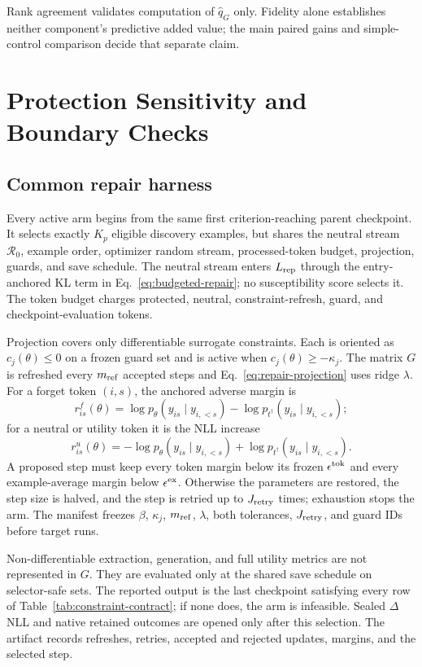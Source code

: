 Rank agreement validates computation of $\widehat q_G$ only. Fidelity alone
establishes neither component's predictive added value; the main paired gains
and simple-control comparison decide that separate claim.

\FloatBarrier

\section{Protection Sensitivity and Boundary Checks}
\label{app:protection-supp}
\label{app:protection-details}

\subsection{Common repair harness}
\label{app:guard-proof}
\label{app:repair-protocol}

Every active arm begins from the same first criterion-reaching parent
checkpoint. It selects exactly $K_p$ eligible discovery examples, but shares
the neutral stream $\mathcal R_0$, example order, optimizer random stream,
processed-token budget, projection, guards, and save schedule. The neutral
stream enters $L_{\rm rep}$ through the entry-anchored KL term in
Eq.~\eqref{eq:budgeted-repair}; no susceptibility score selects it. The token
budget charges protected, neutral, constraint-refresh, guard, and
checkpoint-evaluation tokens.

Projection covers only differentiable surrogate constraints. Each is oriented
as $c_j(\theta)\leq0$ on a frozen guard set and is active when
$c_j(\theta)\geq-\kappa_j$. The matrix $G$ is refreshed every $m_{\rm ref}$
accepted steps and Eq.~\eqref{eq:repair-projection} uses ridge $\lambda$.
For a forget token $(i,s)$, the anchored adverse margin is
\[
 r^{f}_{is}(\theta)=\log p_\theta(y_{is}\mid y_{i,<s})-
 \log p_{t^\dagger}(y_{is}\mid y_{i,<s});
\]
for a neutral or utility token it is the NLL increase
\[
 r^{u}_{is}(\theta)=-\log p_\theta(y_{is}\mid y_{i,<s})+
 \log p_{t^\dagger}(y_{is}\mid y_{i,<s}).
\]
A proposed step must keep every token margin below its frozen
$\epsilon^{\rm tok}$ and every example-average margin below
$\epsilon^{\rm ex}$. Otherwise the parameters are restored, the step size is
halved, and the step is retried up to $J_{\rm retry}$ times; exhaustion stops
the arm. The manifest freezes $\beta$, $\kappa_j$, $m_{\rm ref}$, $\lambda$,
both tolerances, $J_{\rm retry}$, and guard IDs before target runs.

Non-differentiable extraction, generation, and full utility metrics are not
represented in $G$. They are evaluated only at the shared save schedule on
selector-safe sets. The reported output is the last checkpoint satisfying
every row of Table~\ref{tab:constraint-contract}; if none does, the arm is
infeasible. Sealed $\Delta$NLL and native retained outcomes are opened only
after this selection. The artifact records refreshes, retries, accepted and
rejected updates, margins, and the selected step.

